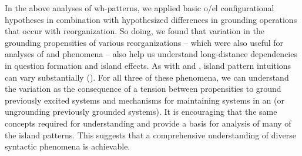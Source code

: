 In the above analyses of wh-patterns, we applied basic o/el configurational hypotheses in combination with hypothesized differences in grounding operations that occur with reorganization. So doing, we found that variation in the grounding propensities of various reorganizations -- which were also useful for analyses of  and  phenomena -- also help us understand long-distance dependencies in  question formation and island effects. As with  and , island pattern  intuitions can vary substantially (\citealt{Kluender1998,SprouseHornstein2013,SprouseEtAl2012}). For all three of these phenomena, we can understand the variation as the consequence of a tension between propensities to ground previously excited systems and mechanisms for maintaining systems in an  (or ungrounding previously grounded systems). It is encouraging that the same concepts required for understanding  and  provide a basis for analysis of many of the island patterns. This suggests that a comprehensive understanding of diverse syntactic phenomena is achievable.

